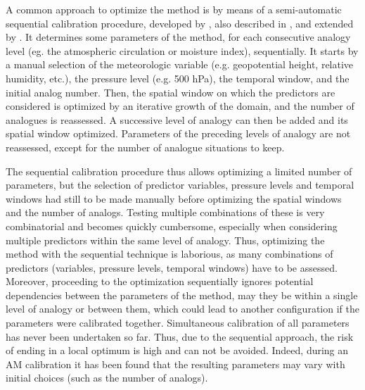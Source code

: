 \documentclass{ametsoc}
\begin{document}
A common approach to optimize the method is by means of a semi-automatic sequential calibration procedure, developed by \citet{Bontron2004}, also described in \citet{BenDaoud2016}, and extended by \citet{Radanovics2013}. It determines some parameters of the method, for each consecutive analogy level (eg. the atmospheric circulation or moisture index), sequentially. It starts by a manual selection of the meteorologic variable (e.g. geopotential height, relative humidity, etc.), the pressure level (e.g. 500 hPa), the temporal window, and the initial analog number. Then, the spatial window on which the predictors are considered is optimized by an iterative growth of the domain, and the number of analogues is reassessed. A successive level of analogy can then be added and its spatial window optimized. Parameters of the preceding levels of analogy are not reassessed, except for the number of analogue situations to keep.

The sequential calibration procedure thus allows optimizing a limited number of parameters, but the selection of predictor variables, pressure levels and temporal windows had still to be made manually before optimizing the spatial windows and the number of analogs. Testing multiple combinations of these is very combinatorial and becomes quickly cumbersome, especially when considering multiple predictors within the same level of analogy. Thus, optimizing the method with the sequential technique is laborious, as many combinations of predictors (variables, pressure levels, temporal windows) have to be assessed. Moreover, proceeding to the optimization sequentially ignores potential dependencies between the parameters of the method, may they be within a single level of analogy or between them, which could lead to another configuration if the parameters were calibrated together. Simultaneous calibration of all parameters has never been undertaken so far. Thus, due to the sequential approach, the risk of ending in a local optimum is high and can not be avoided. Indeed, during an AM calibration it has been found that the resulting parameters may vary with initial choices (such as the number of analogs).
\end{document}
